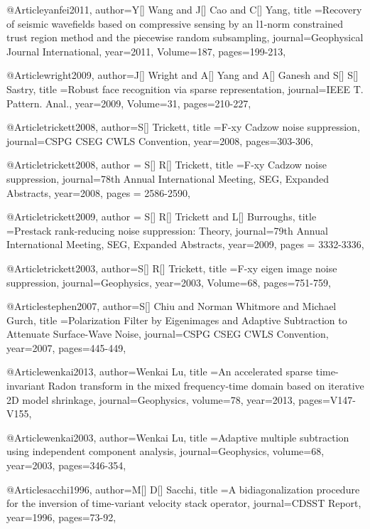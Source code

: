 @Article{yanfei2011,
  author={Y[] Wang and J[] Cao and C[] Yang},
  title ={Recovery of seismic wavefields based on compressive sensing by an l1-norm constrained trust region method and the piecewise random subsampling},
  journal={Geophysical Journal International},
  year=2011,
  Volume=187,
  pages={199-213},
}

@Article{wright2009,
  author={J[] Wright and A[] Yang and A[] Ganesh and S[] S[] Sastry},
  title ={Robust face recognition via sparse representation},
  journal={IEEE T. Pattern. Anal.},
  year=2009,
  Volume=31,
  pages={210-227},
}

@Article{trickett2008,
  author={S[] Trickett},
  title ={{F}-xy Cadzow noise suppression},
  journal={CSPG CSEG CWLS Convention},
  year=2008,
  pages={303-306},
}

@Article{trickett2008,
  author = {S[] R[] Trickett},
  title ={F‐xy Cadzow noise suppression},
  journal={78th Annual International Meeting, SEG, Expanded Abstracts},
  year=2008,
  pages = {2586-2590},
}

@Article{trickett2009,
  author = {S[] R[] Trickett and L[] Burroughs},
  title ={Prestack rank-reducing noise suppression: Theory},
  journal={79th Annual International Meeting, SEG, Expanded Abstracts},
  year=2009,
  pages = {3332-3336},
}

@Article{trickett2003,
  author={S[] R[] Trickett},
  title ={F-xy eigen image noise suppression},
  journal={Geophysics},
  year=2003,
  Volume=68,
  pages={751-759},
}


@Article{stephen2007,
  author={S[] Chiu and Norman Whitmore and Michael Gurch},
  title ={Polarization Filter by Eigenimages and Adaptive Subtraction to Attenuate Surface-Wave Noise},
  journal={CSPG CSEG CWLS Convention},
  year=2007,
  pages={445-449},
}

@Article{wenkai2013,
  author={Wenkai Lu},
  title ={An accelerated sparse time-invariant Radon transform in the mixed frequency-time domain based on iterative 2{D} model shrinkage},
  journal={Geophysics},
  volume=78,
  year=2013,
  pages={V147-V155},
}

@Article{wenkai2003,
  author={Wenkai Lu},
  title ={Adaptive multiple subtraction using independent component analysis},
  journal={Geophysics},
  volume=68,
  year=2003,
  pages={346-354},
}

@Article{sacchi1996,
  author={M[] D[] Sacchi},
  title ={A bidiagonalization procedure for the inversion of time-variant velocity stack operator},
  journal={CDSST Report},
  year=1996,
  pages={73-92},
}


